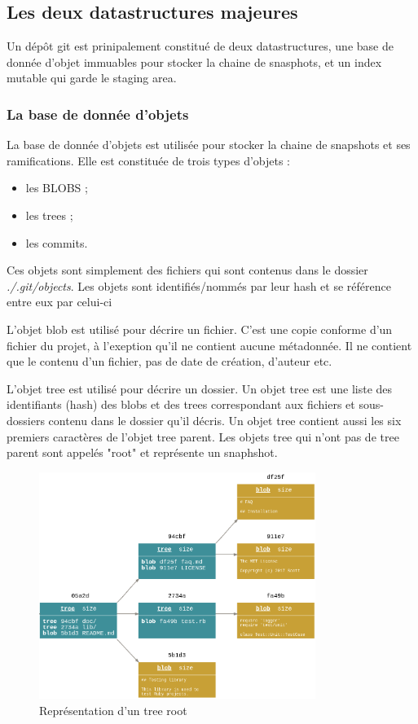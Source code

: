 \documentclass[a4paper, 12pt]{article}
\begin{document}
    \subsection{Les deux datastructures majeures}
    Un dépôt git est prinipalement constitué de deux datastructures, une base de
    donnée d'objet immuables pour stocker la chaine de snasphots, et un index
    mutable qui garde le staging area.

    \subsubsection{La base de donnée d'objets}
    La base de donnée d'objets est utilisée pour stocker la chaine de snapshots
    et ses ramifications. Elle est constituée de trois types d'objets :
    \begin{itemize}
        \item les BLOBS ;
        \item les trees ;
        \item les commits.
    \end{itemize}

    Ces objets sont simplement des fichiers qui sont contenus dans le dossier
    \textit{./.git/objects}. Les objets sont identifiés/nommés par leur hash et
    se référence entre eux par celui-ci

    L'objet blob est utilisé pour décrire un fichier. C'est une copie conforme
    d'un fichier du projet, à l'exeption qu'il ne contient aucune métadonnée.
    Il ne contient que le contenu d'un fichier, pas de date de création,
    d'auteur etc. 

    L'objet tree est utilisé pour décrire un dossier. Un objet tree est une
    liste des identifiants (hash) des blobs et des trees correspondant
    aux fichiers et sous-dossiers contenu dans le dossier qu'il décris. Un objet
    tree contient aussi les six premiers caractères de l'objet tree parent.
    Les objets tree qui n'ont pas de tree parent sont appelés "root" et
    représente un snaphshot.

    \begin{figure}[H]
        \centering
        \includegraphics[width=0.8\textwidth]{figs/tree_object.png}
        \caption{Représentation d'un tree root}
        \label{fig:tree}
    \end{figure}
\end{document}
